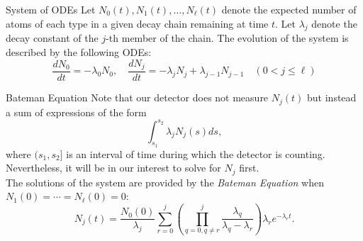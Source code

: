 \documentclass{beamer}
\begin{document}
\begin{frame}{System of ODEs}
  Let $N_0(t),N_1(t),\ldots,N_\ell(t)$ denote the expected number of atoms of each type in a given decay chain remaining at time $t$.
  Let $\lambda_j$ denote the decay constant of the $j$-th member of the chain.
The evolution of the system is described by the following ODEs:
$$
    \frac{dN_0}{dt}=-\lambda_0 N_0, \quad \frac{dN_j}{dt} = -\lambda_j N_j + \lambda_{j-1}N_{j-1} \quad (0<j \leq \ell)
$$
\end{frame}
\begin{frame}{Bateman Equation}
    Note that our detector does not measure $N_j(t)$ but instead a sum of expressions of the form 
    $$
    \int_{s_1}^{s_2}\lambda_j N_j(s)ds,
    $$
where $(s_1,s_2]$ is an interval of time during which the detector is counting.
Nevertheless, it will be in our interest to solve for $N_j$ first.\\
\vspace{0.2cm}
The solutions of the system are provided by the \textit{Bateman Equation} when $N_1(0)=\cdots=N_\ell(0)=0$:
$$
    N_j(t) = \frac{N_0(0)}{\lambda_j}\sum_{r=0}^j\left(\prod_{q=0,q\neq r}^j \frac{\lambda_q}{\lambda_q-\lambda_r}\right)\lambda_r e^{-\lambda_r t}.
$$
\end{frame}
\end{document}
